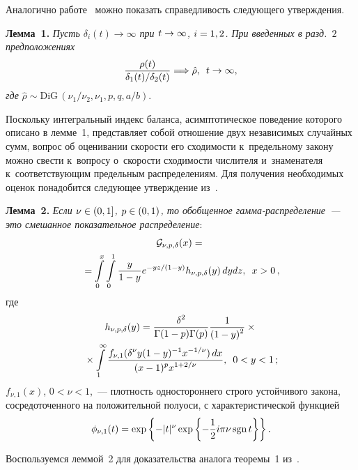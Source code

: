 \begin{multicols}{2}
\smallskip

Аналогично работе~\cite{KuShe2022_1_ru} можно показать справедливость следующего 
утверж\-де\-ния.

\smallskip

\noindent
\textbf{Лемма~1.}
\textit{Пусть $\delta_i(t){\longrightarrow}\infty$ при $t\hm\to\infty$, $i\hm=1,2$.
При введенных в разд.~$2$ предположениях}
\begin{equation*}
\label{Balace_limit}
\displaystyle\frac{\displaystyle \rho(t)\mathstrut}{\displaystyle \delta_1(t)/\delta_2(t)\mathstrut}\Longrightarrow {\hat \rho},\enskip
t\to\infty,
\end{equation*}
\textit{где} ${\hat \rho}\sim \mathrm{DiG}\,(\nu_1/\nu_2,\nu_1,p,q,a/b)$.


\smallskip

Поскольку интегральный индекс баланса, асимптотическое поведение которого 
описано в лемме~1, представляет собой отношение двух 
независимых случайных сумм, вопрос об оценивании ско\-рости его сходимости 
к~предельному закону можно свес\-ти к~вопросу о~ско\-рости сходимости числителя 
и~знаменателя к~соответствующим предельным распределениям. Для получения 
необходимых оценок понадобится сле\-ду\-ющее утверж\-де\-ние из~\cite{ShTs2021}.

\smallskip

\noindent
\textbf{Лемма~2.}
\textit{Если $\nu\hm\in(0,1]$, $p\hm\in(0,1)$, то обобщенное гам\-ма-рас\-пре\-де\-ле\-ние~--- это 
смешанное показательное распределение}:
\begin{multline*}
{\cal G}_{\nu,p,\delta}(x)={}\\
{}=\int\limits_0^x\int\limits_0^1\displaystyle\frac{\displaystyle y\mathstrut}{\displaystyle 1-y\mathstrut}e^{-{y}z/({1-y})} 
h_{\nu,p,\delta}(y)\,dydz,\enskip x>0\,,
\end{multline*}
где
\begin{multline}
h_{\nu,p,\delta}(y)=
\displaystyle\frac{\displaystyle  \delta^2\mathstrut}{\displaystyle \Gamma(1-p)\Gamma(p)\mathstrut}\displaystyle\frac{\displaystyle 1\mathstrut}{\displaystyle (1-y)^2\mathstrut}\times{}\\
{}\times
\int\limits_1^\infty\displaystyle\frac{\displaystyle f_{\nu,1}(\delta^\nu y(1-y)^{-1}x^{-1/\nu})\,dx\mathstrut}{\displaystyle (x-1)^px^{1+2/\nu}\mathstrut},\enskip 0< y<1\,;
\label{h_density}
\end{multline}
$f_{\nu,1}(x)$, $0<\nu<1$,~--- плотность одностороннего строго устойчивого 
закона, сосредоточенного на положительной полуоси, с характеристической функцией
$$
\phi_{\nu,1}(t)=\exp\left\{-|t|^\nu\exp\left\{-\displaystyle\frac{\displaystyle 1\mathstrut}{\displaystyle 2\mathstrut}i\pi\nu\, \mathrm{sgn}\,t\right\}\right\}.
$$



Воспользуемся леммой~2 для доказательства аналога тео\-ре\-мы~1 из~\cite{ShTs2021}.


\end{multicols}
